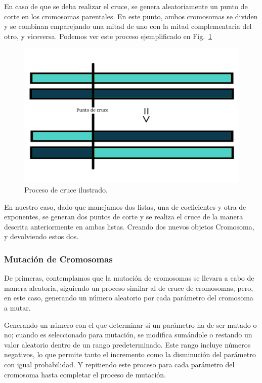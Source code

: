 \documentclass[conference,a4paper]{IEEEtran}
\def\figurename{Fig.}
\begin{document}
En caso de que se deba realizar el cruce, se genera aleatoriamente un punto de corte en los cromosomas parentales. En este punto, ambos cromosomas se dividen y se combinan emparejando una mitad de uno con la mitad complementaria del otro, y viceversa. Podemos ver este proceso ejemplificado en \figurename~\ref{fig:chromosome-crossover}


\begin{figure}[H]
    \centering
    \includegraphics[width=\columnwidth]{image-chromosome-crossover.jpg}
    \caption{Proceso de cruce ilustrado.}
    \label{fig:chromosome-crossover}
\end{figure}


En nuestro caso, dado que manejamos dos listas, una de coeficientes y otra de exponentes, se generan dos puntos de corte y se realiza el cruce de la manera descrita anteriormente en ambas listas. Creando dos nuevos objetos Cromosoma, y devolviendo estos dos.



\subsubsection{Mutación de Cromosomas}
De primeras, contemplamos que la mutación de cromosomas se llevara a cabo de manera aleatoria, siguiendo un proceso similar al de cruce de cromosomas, pero, en este caso, generando un número aleatorio por cada parámetro del cromosoma a mutar.


Generando un número con el que determinar si un parámetro ha de ser mutado o no; cuando es seleccionado para mutación, se modifica sumándole o restando un valor aleatorio dentro de un rango predeterminado. Este rango incluye números negativos, lo que permite tanto el incremento como la disminución del parámetro con igual probabilidad. Y repitiendo este proceso para cada parámetro del cromosoma hasta completar el proceso de mutación.
\end{document}

